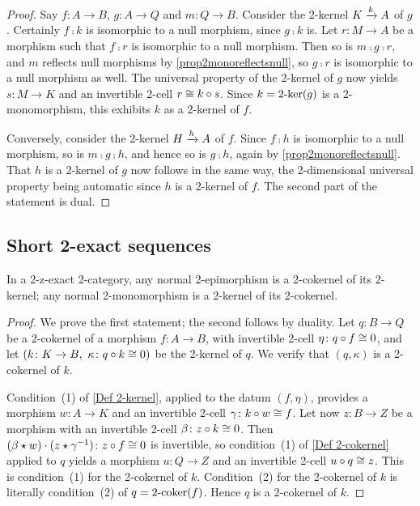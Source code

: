 \begin{proof}
  \leanok
  Say \(f\colon A\to B\), \(g\colon A\to Q\) and \(m\colon Q\to B\). Consider the 2-kernel \(K\xrightarrow[]{k}A\) of \(g\). Certainly \(f\comp k\) is isomorphic to a null morphism, since \(g\comp k\) is. Let \(r\colon M\to A\) be a morphism such that \(f\comp r\) is isomorphic to a null morphism. Then so is \(m\comp g\comp r\), and \(m\) reflects null morphisms by \prox\ref{prop2monoreflectsnull}, so \(g\comp r\) is isomorphic to a null morphism as well. The universal property of the 2-kernel of \(g\) now yields \(s\colon M\to K\) and an invertible 2-cell \(r\cong k\circ s\). Since \(k=2\text{-}\mathrm{ker}(g)\) is a 2-monomorphism, this exhibits \(k\) as a 2-kernel of \(f\).

	Conversely, consider the 2-kernel \(H\xrightarrow[]{h}A\) of \(f\). Since \(f\comp h\) is isomorphic to a null morphism, so is \(m\comp g\comp h\), and hence so is \(g\comp h\), again by \prox\ref{prop2monoreflectsnull}. That \(h\) is a 2-kernel of \(g\) now follows in the same way, the 2-dimensional universal property being automatic since \(h\) is a 2-kernel of \(f\). The second part of the statement is dual.
\end{proof}

\subsection{Short 2-exact sequences}\label{SS:SES}

\begin{proposition}
  \label{kernel is kernel of its cokernel}   \leanok
  In a 2-z-exact 2-category, any normal 2-epimorphism is a 2-cokernel of its 2-kernel; any normal 2-monomorphism is a 2-kernel of its 2-cokernel.
\end{proposition}

\begin{proof}
  \leanok
  We prove the first statement; the second follows by duality. Let \(q\colon B\to Q\) be a 2-cokernel of a morphism \(f\colon A\to B\), with invertible 2-cell \(\eta\colon q\circ f\cong 0\), and let \((k\colon K\to B,\ \kappa\colon q\comp k\iso 0)\) be the 2-kernel of \(q\). We verify that \((q,\kappa)\) is a 2-cokernel of \(k\).

	Condition~(1) of \ref{Def 2-kernel}, applied to the datum \((f,\eta)\), provides a morphism \(w\colon A\to K\) and an invertible 2-cell \(\gamma\colon k\circ w\cong f\). Let now \(z\colon B\to Z\) be a morphism with an invertible 2-cell \(\beta\colon z\circ k\cong 0\). Then \((\beta\star w)\cdot(z\star\gamma^{-1})\colon z\circ f\cong 0\) is invertible, so condition~(1) of \ref{Def 2-cokernel} applied to \(q\) yields a morphism \(u\colon Q\to Z\) and an invertible 2-cell \(u\circ q\cong z\). This is condition~(1) for the 2-cokernel of \(k\). Condition~(2) for the 2-cokernel of \(k\) is literally condition~(2) of \(q=2\text{-}\mathrm{coker}(f)\). Hence \(q\) is a 2-cokernel of \(k\).
\end{proof}

